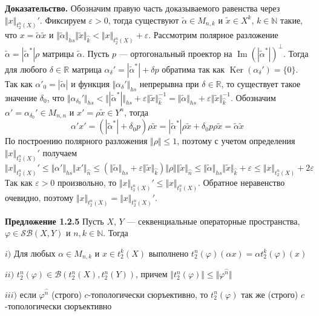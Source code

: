 \documentclass[12pt]{article}
\begin{document}
{\bf Доказательство.} Обозначим правую часть доказываемого равенства через $\Vert x\Vert_{t_2^n(X)}'$. Фиксируем $\varepsilon>0$, тогда существуют $\tilde{\alpha}\in M_{n,k}$ и $\tilde{x}\in X^{k}$, $k\in\mathbb{N}$ такие, что 
$x=\tilde{\alpha}\tilde{x}$ и $\Vert\tilde{\alpha}\Vert_{hs}\Vert\tilde{x}\Vert_{\wideparen{k}}<\Vert x\Vert_{t_2^n(X)}+\varepsilon$. Рассмотрим полярное разложение 
$\tilde{\alpha}=|\tilde{\alpha}^*| \rho$ матрицы $\tilde{\alpha}$. Пусть $p$ --- ортогональный проектор на $\operatorname{Im}(|\tilde{\alpha}^*|)^\perp$. Тогда для любого $\delta\in\mathbb{R}$ матрица 
$\alpha_\delta'=|\tilde{\alpha}^*|+\delta p$ обратима так как $\operatorname{Ker}(\alpha_\delta')=\{0\}$. Так как $\alpha'_0=|\tilde{\alpha}|$ и функция $\Vert\alpha_\delta'\Vert_{hs}$ непрерывна при 
$\delta\in\mathbb{R}$, то существует такое значение $\delta_0$, что 
$\Vert\alpha_{\delta_0}'\Vert_{hs}<\Vert|\tilde{\alpha}^*|\Vert_{hs}+\varepsilon\Vert \tilde{x}\Vert_{\wideparen{k}}^{-1}=\Vert\tilde{\alpha}\Vert_{hs}+\varepsilon\Vert \tilde{x}\Vert_{\wideparen{k}}^{-1}$. 
Обозначим $\alpha'=\alpha_{\delta_0}'\in M_{n,n}$ и $x'=\rho\tilde{x}\in Y^n$, тогда 
$$
\alpha'x'
=(|\tilde{\alpha}^*|+\delta_0 p)\rho \tilde{x}
=|\tilde{\alpha}^*|\rho \tilde{x}+\delta_0 p\rho \tilde{x}
=\tilde{\alpha}\tilde{x}
$$
По построению полярного разложения $\Vert \rho\Vert\leq 1$, поэтому с учетом определения $\Vert x\Vert_{t_2^n(X)}'$ получаем
$$
\Vert x\Vert_{t_2^n(X)}'\leq
\Vert\alpha'\Vert_{hs}\Vert x'\Vert_{\wideparen{n}}
\leq (\Vert\tilde{\alpha}\Vert_{hs}+\varepsilon\Vert \tilde{x}\Vert_{\wideparen{k}})\Vert \rho\Vert\Vert\tilde{x}\Vert_{\wideparen{n}}
\leq\Vert\tilde{\alpha}\Vert_{hs}\Vert\tilde{x}\Vert_{\wideparen{k}}+\varepsilon
\leq \Vert x\Vert_{t_2^n(X)}+2\varepsilon
$$
Так как $\varepsilon>0$ произвольно, то $\Vert x\Vert_{t_2^n(X)}'\leq\Vert x\Vert_{t_2^n(X)}$. Обратное неравенство очевидно, поэтому $\Vert x\Vert_{t_2^n(X)}=\Vert x\Vert_{t_2^n(X)}'$.

\medskip

{\bf Предложение 1.2.5}\label{PrT2nOfOpIsWellDef}
Пусть $X$, $Y$ --- секвенциальные операторные пространства, $\varphi\in\mathcal{SB}(X,Y)$ и $n,k\in\mathbb{N}$. Тогда 

$i)$ Для любых $\alpha\in M_{n,k}$ и $x\in t_2^k(X)$ выполнено $t_2^n(\varphi)(\alpha x)=\alpha t_2^k(\varphi)(x)$

$ii)$ $t_2^n(\varphi)\in\mathcal{B}(t_2^n(X),t_2^n(Y))$, причем $\Vert t_2^n(\varphi)\Vert\leq\Vert\varphi^{\wideparen{n}}\Vert$

$iii)$ если $\varphi^{\wideparen{n}}$ (строго) $c$-топологически сюръективно, то $t_2^n(\varphi)$ так же (строго) $c$-топологически сюръективно
\end{document}
